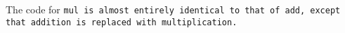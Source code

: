 The code for \tt{mul} is almost entirely identical to that of
\tt{add}, except that addition is replaced with multiplication.
